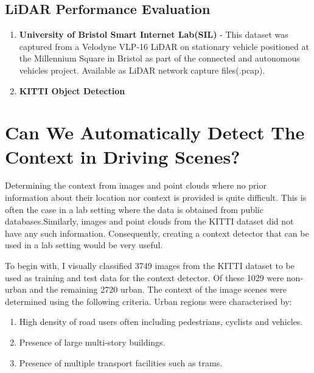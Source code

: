 \subsection{LiDAR Performance Evaluation}

\begin{enumerate}
	\item \textbf{University of Bristol Smart Internet Lab(SIL)} - This dataset was captured from a  Velodyne VLP-16 LiDAR on stationary vehicle positioned at the Millennium Square in Bristol as part of the connected and autonomous vehicles project. Available as LiDAR network capture files(.pcap).
	\item \textbf{KITTI Object Detection}
\end{enumerate}

\section{Can We Automatically Detect The  Context in Driving Scenes?}

Determining the context from images and point clouds where no prior information about their location nor context  is provided is quite difficult. This is often the case in a lab setting where the data is obtained from public databases.Similarly, images and point clouds from the KITTI dataset did not have any such information. Consequently, creating a context detector that can be used in a lab setting would be very useful. 


To begin with, I visually classified 3749 images from the KITTI dataset to be used as training and test data for the context detector. Of these 1029 were non-urban and the remaining 2720 urban. 
The context of the image scenes were determined using the following criteria.
Urban regions were characterised by:
\begin{enumerate}
	\item High density of road users often including pedestrians, cyclists and vehicles. 
	\item Presence of large multi-story buildings. 
	\item Presence of multiple transport facilities such as trams. 
\end{enumerate}

